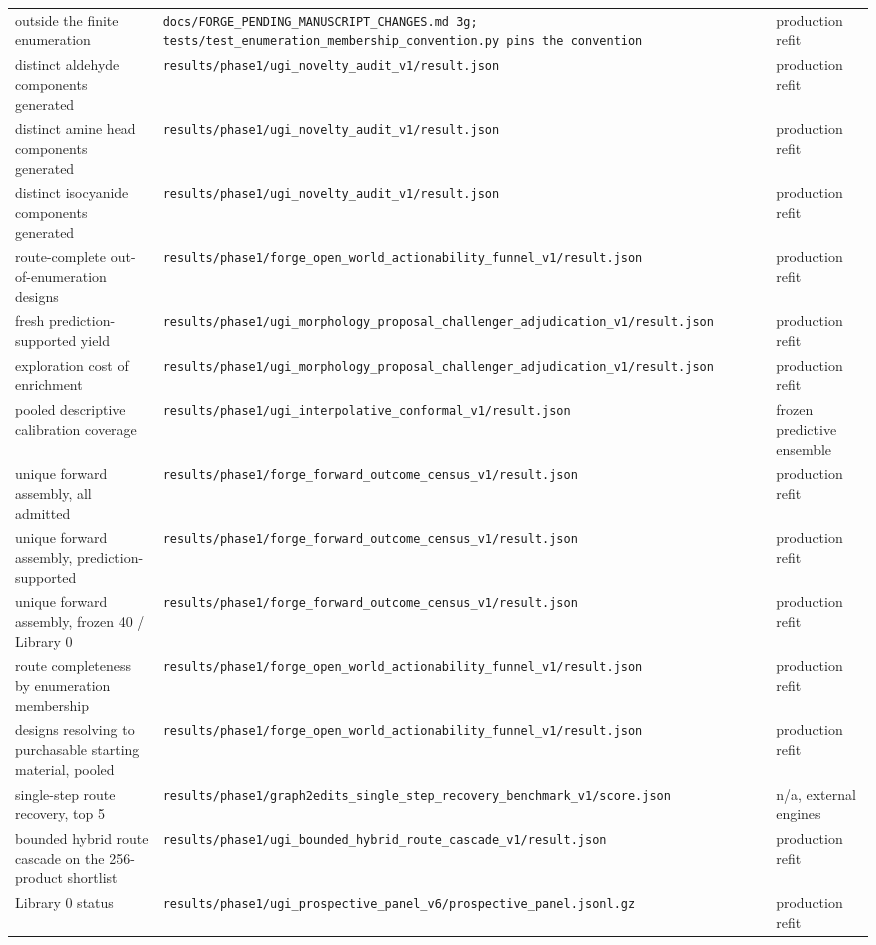\documentclass{article}
\begin{document}
\begin{table}[h]
\begin{tabular}{@{}p{4.0cm}p{6.1cm}p{2.4cm}@{}}
outside the finite enumeration & \texttt{docs/FORGE\_PENDING\_MANUSCRIPT\_CHANGES.md 3g; tests/test\_enumeration\_membership\_convention.py pins the convention} & production refit \\
distinct aldehyde components generated & \texttt{results/phase1/ugi\_novelty\_audit\_v1/result.json} & production refit \\
distinct amine head components generated & \texttt{results/phase1/ugi\_novelty\_audit\_v1/result.json} & production refit \\
distinct isocyanide components generated & \texttt{results/phase1/ugi\_novelty\_audit\_v1/result.json} & production refit \\
route-complete out-of-enumeration designs & \texttt{results/phase1/forge\_open\_world\_actionability\_funnel\_v1/result.json} & production refit \\
fresh prediction-supported yield & \texttt{results/phase1/ugi\_morphology\_proposal\_challenger\_adjudication\_v1/result.json} & production refit \\
exploration cost of enrichment & \texttt{results/phase1/ugi\_morphology\_proposal\_challenger\_adjudication\_v1/result.json} & production refit \\
pooled descriptive calibration coverage & \texttt{results/phase1/ugi\_interpolative\_conformal\_v1/result.json} & frozen predictive ensemble \\
unique forward assembly, all admitted & \texttt{results/phase1/forge\_forward\_outcome\_census\_v1/result.json} & production refit \\
unique forward assembly, prediction-supported & \texttt{results/phase1/forge\_forward\_outcome\_census\_v1/result.json} & production refit \\
unique forward assembly, frozen 40 / Library 0 & \texttt{results/phase1/forge\_forward\_outcome\_census\_v1/result.json} & production refit \\
route completeness by enumeration membership & \texttt{results/phase1/forge\_open\_world\_actionability\_funnel\_v1/result.json} & production refit \\
designs resolving to purchasable starting material, pooled & \texttt{results/phase1/forge\_open\_world\_actionability\_funnel\_v1/result.json} & production refit \\
single-step route recovery, top 5 & \texttt{results/phase1/graph2edits\_single\_step\_recovery\_benchmark\_v1/score.json} & n/a, external engines \\
bounded hybrid route cascade on the 256-product shortlist & \texttt{results/phase1/ugi\_bounded\_hybrid\_route\_cascade\_v1/result.json} & production refit \\
Library 0 status & \texttt{results/phase1/ugi\_prospective\_panel\_v6/prospective\_panel.jsonl.gz} & production refit \\
\bottomrule
\end{tabular}
\end{table}
\end{document}
